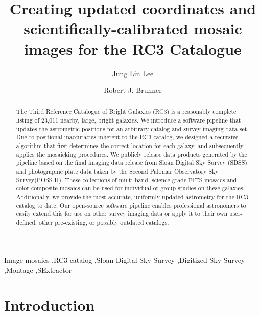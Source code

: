 \documentclass[authoryear, 12pt, 5p, times]{elsarticle}
\begin{document}
\begin{frontmatter}
\title{Creating updated coordinates and scientifically-calibrated mosaic images for the RC3 Catalogue}
\author[ucb]{Jung Lin Lee}
\author[ui]{Robert J. Brunner}
\address[ucb]{Astronomy Department, University of California at Berkeley, Berkeley, CA 94720-3411} 
\address[ui]{Department of Astronomy, University of Illinois, Urbana, IL 61801}

\begin{abstract}
The Third Reference Catalogue of Bright Galaxies (RC3) is a reasonably complete listing of 23,011 nearby, large, bright galaxies. We introduce a software pipeline that updates the astrometric positions for an arbitrary catalog and survey imaging data set. Due to positional inaccuracies inherent to the RC3 catalog, we designed a recursive algorithm that first determines the correct location for each galaxy, and subsequently applies the mosaicking procedures.  We publicly release data products generated by the pipeline based on the final imaging data release from Sloan Digital Sky Survey (SDSS) and photographic plate data taken by the Second Palomar Observatory Sky Survey(POSS-II). These collections of multi-band,  science-grade FITS mosaics and  color-composite mosaics can be used for individual or group studies on these galaxies. Additionally, we provide the most accurate, uniformly-updated astrometry for the RC3 catalog to date. Our open-source software pipeline enables professional astronomers to easily extend this for use on other survey imaging data or apply it to their own user-defined, other pre-existing, or possibly outdated catalogs. 
\end{abstract}

\begin{keyword}
Image mosaics \sep RC3 catalog \sep Sloan Digital Sky Survey \sep Digitized Sky Survey \sep Montage \sep SExtractor
\end{keyword}

\end{frontmatter}

\section{Introduction}
\end{document}
